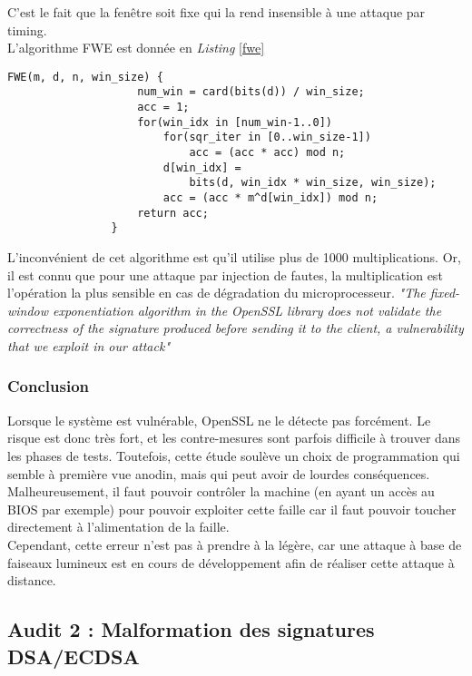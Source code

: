 			C'est le fait que la fenêtre soit fixe qui la rend insensible à une attaque par timing.\\

			L'algorithme FWE est donnée en \textit{Listing} \ref{fwe}
		
			\begin{lstlisting}[style=customc,caption=fwe.c, label=fwe]
				FWE(m, d, n, win_size) {
					num_win = card(bits(d)) / win_size;
					acc = 1;
					for(win_idx in [num_win-1..0])
						for(sqr_iter in [0..win_size-1])
							acc = (acc * acc) mod n;
						d[win_idx] =
							bits(d, win_idx * win_size, win_size);
						acc = (acc * m^d[win_idx]) mod n;
					return acc;
				}
			\end{lstlisting}
		

			L'inconvénient de cet algorithme est qu'il utilise plus de 1000 multiplications. Or, il est connu que pour une attaque par injection de fautes, la multiplication est l'opération la plus sensible en cas de dégradation du microprocesseur. \textit{"The fixed-window exponentiation algorithm in the OpenSSL library does not validate the correctness of the signature produced before sending it to the client, a vulnerability that we exploit in our attack"}\\
			

		\subsubsection{Conclusion}

			Lorsque le système est vulnérable, OpenSSL ne le détecte pas forcément. Le risque est donc très fort, et les contre-mesures sont parfois difficile à trouver dans les phases de tests. Toutefois, cette étude soulève un choix de programmation qui semble à première vue anodin, mais qui peut avoir de lourdes conséquences.\\

			Malheureusement, il faut pouvoir contrôler la machine (en ayant un accès au BIOS par exemple) pour pouvoir exploiter cette faille car il faut pouvoir toucher directement à l'alimentation de la faille.\\

			Cependant, cette erreur n'est pas à prendre à la légère, car une attaque à base de faiseaux lumineux est en cours de développement afin de réaliser cette attaque à distance.
		
\subsection{Audit 2 : Malformation des signatures DSA/ECDSA}
